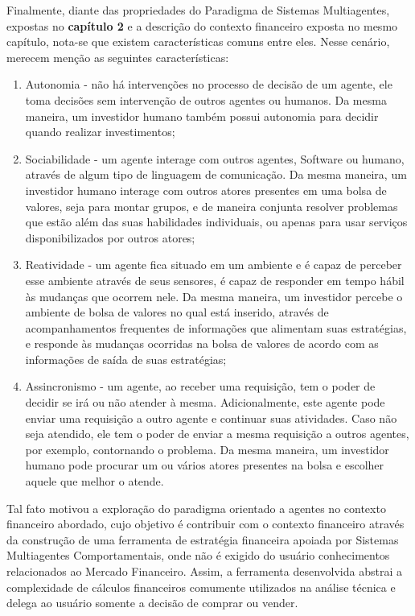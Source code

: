 \begin{description}
Finalmente, diante das propriedades do Paradigma de Sistemas Multiagentes, expostas no \textbf{capítulo 2} e a descrição do contexto financeiro exposta no mesmo capítulo, nota-se que existem características comuns entre eles. Nesse cenário, merecem menção as seguintes características:

\begin{enumerate}
\item Autonomia - não há intervenções no processo de decisão de um agente, ele toma decisões sem intervenção de outros agentes ou humanos. Da mesma maneira, um investidor humano também possui autonomia para decidir quando realizar investimentos;

\item Sociabilidade - um agente interage com outros agentes, Software ou humano, através de  algum tipo de linguagem de comunicação. Da mesma maneira, um investidor humano interage com outros atores presentes em uma bolsa de valores, seja para montar grupos, e de maneira conjunta resolver problemas que estão além das suas habilidades individuais, ou apenas para usar serviços disponibilizados por outros atores;

\item Reatividade - um agente fica situado em um ambiente e é capaz de perceber esse ambiente através de seus sensores, é capaz de responder em tempo hábil às mudanças que ocorrem nele. Da mesma maneira, um investidor percebe o ambiente de bolsa de valores no qual está inserido, através de acompanhamentos frequentes de informações que alimentam suas estratégias, e responde às mudanças ocorridas na bolsa de valores de acordo com as informações de saída de suas estratégias;
\item Assincronismo -  um agente, ao receber uma requisição, tem o poder de decidir se irá ou não atender à mesma. Adicionalmente, este agente pode enviar uma requisição a outro agente e continuar suas atividades. Caso não seja atendido, ele tem o poder de enviar a mesma requisição a outros agentes, por exemplo, contornando o problema. Da mesma maneira, um investidor humano pode procurar um ou vários atores presentes na bolsa e escolher aquele que melhor o atende.

\end{enumerate}

Tal fato motivou a exploração do paradigma orientado a agentes no contexto financeiro abordado, cujo objetivo é contribuir com o contexto financeiro através da construção de uma ferramenta de estratégia financeira apoiada por Sistemas Multiagentes Comportamentais, onde não é exigido do usuário conhecimentos relacionados ao Mercado Financeiro. Assim, a ferramenta desenvolvida abstrai a complexidade de cálculos financeiros comumente utilizados na análise técnica e delega ao usuário somente a decisão de comprar ou vender.

\end{description}

